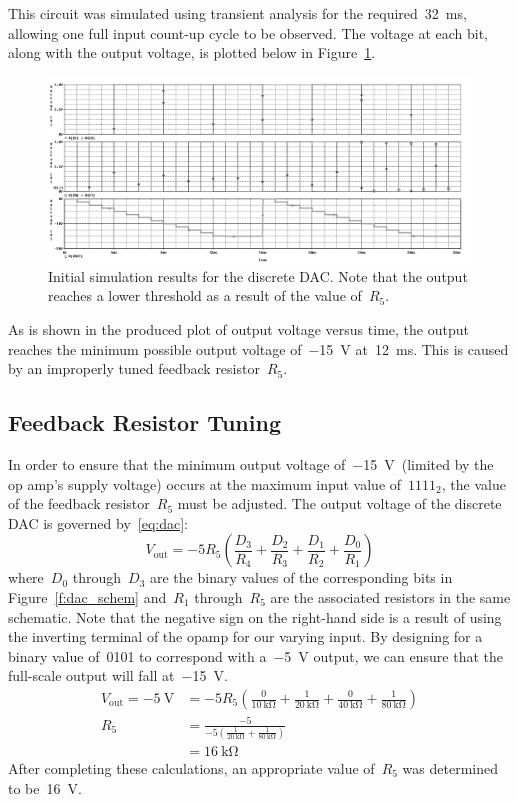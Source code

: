 %
This circuit was simulated using transient analysis for the
required~\SI{32}{\milli\second}, allowing one full input count-up cycle to be
observed.  The voltage at each bit, along with the output voltage, is plotted
below in Figure~\ref{f:dac_plot1}.
%
\begin{figure}[H]
\centering
	\includegraphics[width=.8\textwidth]{img/plot/part1_plot1b.PNG}
	\parbox{.8\textwidth}{
	\caption[Discrete DAC --- Initial Results]{Initial simulation results for
	the discrete DAC.  Note that the output reaches a lower threshold as a
	result of the value of~$R_5$.}
	\label{f:dac_plot1}}
\end{figure}
%
As is shown in the produced plot of output voltage versus time, the output
reaches the minimum possible output voltage of~\SI{-15}{\volt}
at~\SI{12}{\milli\second}.  This is caused by an improperly tuned feedback
resistor~$R_5$.

\subsection{Feedback Resistor Tuning}
In order to ensure that the minimum output voltage of~\SI{-15}{\volt}~(limited
by the op amp's supply voltage) occurs at the maximum input value of~$1111_2$,
the value of the feedback resistor~$R_5$ must be adjusted.  The output voltage
of the discrete DAC is governed by~\eqref{eq:dac}:
%
\begin{equation}
	V_\text{out} = - 5 R_5 \left( \frac{D_3}{R_4} + \frac{D_2}{R_3} + \frac{D_1}{R_2} + \frac{D_0}{R_1} \right)
	\label{eq:dac}
\end{equation}
%
where~$D_0$ through~$D_3$ are the binary values of the corresponding bits in
Figure~\ref{f:dac_schem} and~$R_1$ through~$R_5$ are the associated resistors
in the same schematic.  Note that the negative sign on the right-hand side is a
result of using the inverting terminal of the opamp for our varying input.  By
designing for a binary value of~0101 to correspond with a~\SI{-5}{\volt}
output, we can ensure that the full-scale output will fall at~\SI{-15}{\volt}.
%
\begin{align*}
	V_\text{out} = \SI{-5}{\volt} &= -5 R_5 \left( \frac{0}{\SI{10}{\kilo\ohm}} + \frac{1}{\SI{20}{\kilo\ohm}} + \frac{0}{\SI{40}{\kilo\ohm}} + \frac{1}{\SI{80}{\kilo\ohm}} \right) \\
	R_5 &= \frac{ -5 } { -5 \left( \frac{1}{\SI{20}{\kilo\ohm}} + \frac{1}{\SI{80}{\kilo\ohm}} \right) } \\
	    &= \SI{16}{\kilo\ohm}
\end{align*}
%
After completing these calculations, an appropriate value of~$R_5$ was
determined to be~\SI{16}{\volt}.

